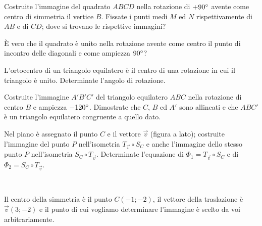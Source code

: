 \begin{esercizio}
\label{ese:8.59} %
Costruite l'immagine del quadrato $ABCD$ nella rotazione di $+90{}^{\circ}$ avente come centro di simmetria il vertice $B$.
Fissate i punti medi $M$ ed $N$ rispettivamente di $AB$ e di $CD$; dove si trovano le rispettive immagini?
\end{esercizio}

\begin{esercizio}
\label{ese:8.60} %
\`E vero che il quadrato è unito nella rotazione avente come centro il punto di incontro delle diagonali e come ampiezza $90{}^{\circ}$?
\end{esercizio}

\begin{esercizio}
\label{ese:8.61} %
L'ortocentro di un triangolo equilatero è il centro di una rotazione in cui il triangolo è unito. Determinate l'angolo di rotazione.
\end{esercizio}

\begin{esercizio}
\label{ese:8.62} %
Costruite l'immagine $A'B'C'$ del triangolo equilatero $ABC$ nella rotazione di centro $B$ e ampiezza $-120{}^{\circ}$. Dimostrate che $C$, $B$ ed $A'$ sono allineati e che $ABC'$ è un triangolo equilatero congruente a quello dato.
\end{esercizio}

\noindent\begin{minipage}{0.75\textwidth}\parindent15pt
\begin{esercizio}
\label{ese:8.63} %
Nel piano è assegnato il punto $C$ e il vettore $\vec{v}$ (figura a lato); costruite l'immagine del punto $P$ nell'isometria $T_{\vec{v}} \circ S_{C}$ e anche l'immagine dello stesso punto $P$ nell'isometria $S_{C} \circ T_{\vec{v}}$. Determinate l'equazione di $\Phi_1 = T_{\vec{v}} \circ S_{C}$ e di $\Phi_2 = S_{C} \circ T_{\vec{v}}$.
\end{esercizio}
\end{minipage}\hfil
\begin{minipage}{0.25\textwidth}
	\centering~~
\end{minipage}\vspace{8pt}

\begin{esercizio}
\label{ese:8.64} %
Il centro della simmetria è il punto $C(-1;-2)$, il vettore della traslazione è $\vec{v}(3;-2)$ e il punto di cui vogliamo determinare l'immagine è scelto da voi arbitrariamente. 
\end{esercizio}

